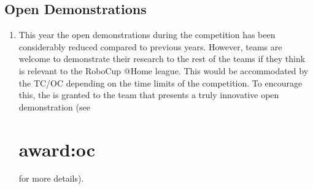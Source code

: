 \subsection{Open Demonstrations}
\label{sec:open-demonstrations}
\begin{enumerate}
	
	\item This year the open demonstrations during the competition has been considerably reduced compared to previous years. However, teams are welcome to demonstrate their research to the rest of the teams if they think is relevant to the RoboCup @Home league. This would be accommodated by the TC/OC depending on the time limits of the competition. To encourage this, the  is granted to the team that presents a truly innovative open demonstration (see \section{award:oc} for more details).



\end{enumerate}

